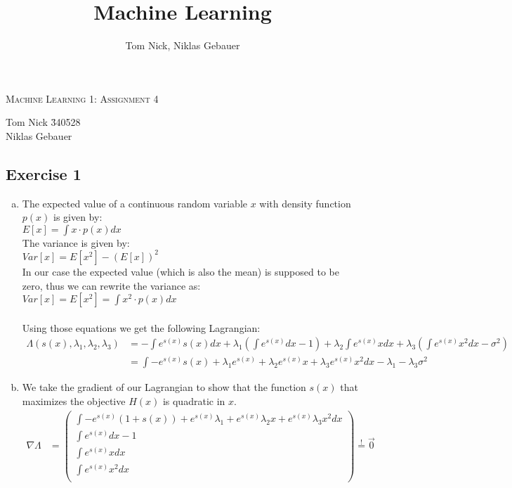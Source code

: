 \documentclass[10pt,a4paper]{article}
\author{Tom Nick, Niklas Gebauer}
\title{Machine Learning}
\begin{document}
\begin{center}
\Large{\textsc{Machine Learning 1: Assignment 4}} \\
\end{center}

\begin{tabbing}
Tom Nick \hspace{0.9cm}\= 340528\\
Niklas Gebauer 
\end{tabbing}

\subsection*{Exercise 1}
\begin{enumerate}[(a)]
\item
The expected value of a continuous random variable $x$ with density function $p(x)$ is given by:\\
$E[x] = \int x\cdot p(x) dx$\\
The variance is given by:\\
$Var[x] = E[x^2]-(E[x])^2$\\
In our case the expected value (which is also the mean) is supposed to be zero, thus we can rewrite the variance as:\\
$Var[x] = E[x^2] = \int x^2 \cdot p(x)dx$\\
\\
Using those equations we get the following Lagrangian:
\begin{align*}
    \Lambda(s(x),\lambda_1,\lambda_2,\lambda_3) &= -\int e^{s(x)}s(x)dx+\lambda_1 (\int e^{s(x)}dx - 1) + \lambda_2 \int e^{s(x)}xdx + \lambda_3 (\int e^{s(x)}x^2dx-\sigma^2)\\
    &= \int -e^{s(x)}s(x) + \lambda_1 e^{s(x)} + \lambda_2 e^{s(x)}x + \lambda_3 e^{s(x)} x^2 dx - \lambda_1 - \lambda_3 \sigma^2
\end{align*}
\item
We take the gradient of our Lagrangian to show that the function $s(x)$ that maximizes the objective $H(x)$ is quadratic in $x$.
\begin{align*}
    \nabla \Lambda &= \left(
        \begin{array}{c}
            \int -e^{s(x)}(1+s(x))+e^{s(x)}\lambda_1 + e^{s(x)}\lambda_2x + e^{s(x)}\lambda_3 x^2 dx\\
            \int e^{s(x)}dx - 1\\
            \int e^{s(x)} x dx\\
            \int e^{s(x)} x^2 dx\\
        \end{array}
    \right) \overset{!}{=} \vec{0} \\
\end{align*}


\end{enumerate}
\end{document}
